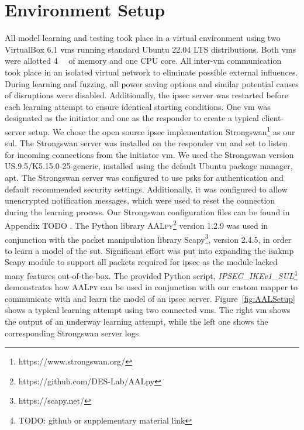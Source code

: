 \section{Environment Setup} \label{sec:env}
All model learning and testing took place in a virtual environment using two VirtualBox 6.1 \acp{vm} running standard Ubuntu 22.04 LTS distributions. Both \acp{vm} were allotted \SI{4}{\giga\byte} of memory and one CPU core. All inter-\ac{vm} communication took place in an isolated virtual network to eliminate possible external influences. During learning and fuzzing, all power saving options and similar potential causes of disruptions were disabled. Additionally, the \ac{ipsec} server was restarted before each learning attempt to ensure identical starting conditions. One \ac{vm} was designated as the initiator and one as the responder to create a typical client-server setup. We chose the open source \ac{ipsec} implementation Strongswan\footnote{https://www.strongswan.org/} as our \ac{sul}. The Strongswan server was installed on the responder \ac{vm} and set to listen for incoming connections from the initiator \ac{vm}. We used the Strongswan version US.9.5/K5.15.0-25-generic, installed using the default Ubuntu package manager, apt. The Strongswan server was configured to use \acp{psk} for authentication and default recommended security settings. Additionally, it was configured to allow unencrypted notification messages, which were used to reset the connection during the learning process. Our Strongswan configuration files can be found in Appendix TODO . The Python library \textsc{AALpy}\footnote{https://github.com/DES-Lab/AALpy} version 1.2.9 was used in conjunction with the packet manipulation library Scapy\footnote{https://scapy.net/}, version 2.4.5, in order to learn a model of the \ac{sut}. Significant effort was put into expanding the \ac{isakmp} Scapy module to support all packets required for \ac{ipsec} as the module lacked many features out-of-the-box. The provided Python script, \emph{IPSEC\_IKEv1\_SUL}\footnote{TODO: github or supplementary material link} demonstrates how \textsc{AALpy} can be used in conjunction with our custom mapper to communicate with and learn the model of an \ac{ipsec} server. Figure~\ref{fig:AALSetup} shows a typical learning attempt using two connected \acp{vm}. The right \ac{vm} shows the output of an underway learning attempt, while the left one shows the corresponding Strongswan server logs.

